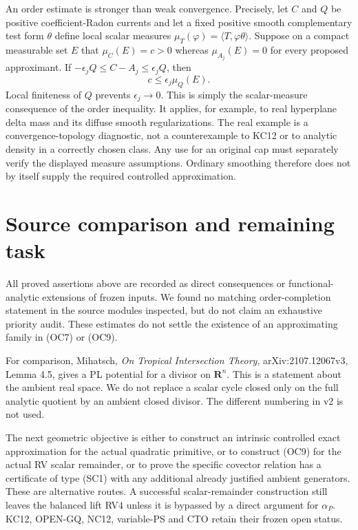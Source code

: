 \documentclass[11pt]{article}
\theoremstyle{remark}\newtheorem{remark}[theorem]{Remark}
\begin{document}
An order estimate is stronger than weak convergence. Precisely, let $C$
and $Q$ be positive coefficient-Radon currents and let a fixed positive
smooth complementary test form $\theta$ define local scalar measures
$\mu_T(\varphi)=\langle T,\varphi\theta\rangle$. Suppose on a compact
measurable set $E$ that $\mu_C(E)=c>0$ whereas $\mu_{A_j}(E)=0$ for
every proposed approximant. If
$-\epsilon_jQ\le C-A_j\le\epsilon_jQ$, then
\[
                       c\le\epsilon_j\mu_Q(E).          \tag{OC10}
\]
Local finiteness of $Q$ prevents $\epsilon_j\to0$. This is simply the
scalar-measure consequence of the order inequality. It applies, for
example, to real hyperplane delta mass and its diffuse smooth
regularizations. The real example is a convergence-topology diagnostic,
not a counterexample to KC12 or to analytic density in a correctly
chosen class. Any use for an original cap must separately verify the
displayed measure assumptions. Ordinary smoothing therefore does not
by itself supply the required controlled approximation.

\section{Source comparison and remaining task}

All proved assertions above are recorded as direct consequences or
functional-analytic extensions of frozen inputs. We found no matching
order-completion statement in the source modules inspected, but do not
claim an exhaustive priority audit. These estimates do not settle the
existence of an approximating family in (OC7) or (OC9).

For comparison, Mihatsch, \emph{On Tropical Intersection Theory},
arXiv:2107.12067v3, Lemma 4.5, gives a PL potential for a divisor on
$\mathbf R^n$. This is a statement about the ambient real space. We do
not replace a scalar cycle closed only on the full analytic quotient
by an ambient closed divisor. The different numbering in v2 is not used.

The next geometric objective is either to construct an intrinsic
controlled exact approximation for the actual quadratic primitive, or
to construct (OC9) for the actual RV scalar remainder, or to prove the
specific covector relation has a certificate of type (SC1) with any
additional already justified ambient generators. These are alternative
routes. A successful scalar-remainder construction still leaves the
balanced lift RV4 unless it is bypassed by a direct argument for
$\alpha_P$. KC12, OPEN-GQ, NC12, variable-PS and CTO retain their
frozen open status.
\end{document}
